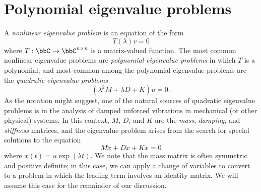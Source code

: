\section{Polynomial eigenvalue problems}

A {\em nonlinear eigenvalue problem} is an equation of the form
\[
  T(\lambda) v = 0
\]
where $T : \bbC \rightarrow \bbC^{n \times n}$ is a matrix-valued
function.  The most common nonlinear eigenvalue problems are
{\em polynomial eigenvalue problems} in which $T$ is a polynomial;
and most common among the polynomial eigenvalue problems are the
{\em quadratic eigenvalue problems}
\[
  (\lambda^2 M + \lambda D + K) u = 0.
\]
As the notation might suggest, one of the natural sources of
quadratic eigenvalue problems is in the analysis of damped
unforced vibrations in mechanical (or other physical) systems.
In this context, $M$, $D$, and $K$ are the {\em mass},
{\em damping}, and {\em stiffness} matrices, and the eigenvalue
problem arises from the search for special solutions to the
equation
\[
  M\ddot{x} + D\dot{x} + Kx = 0
\]
where $x(t) = u \exp(\lambda t)$.  We note that the mass matrix
is often symmetric and positive definite; in this case, we can
apply a change of variables to convert to a problem in which the
leading term involves an identity matrix.  We will assume this case
for the remainder of our discussion.

